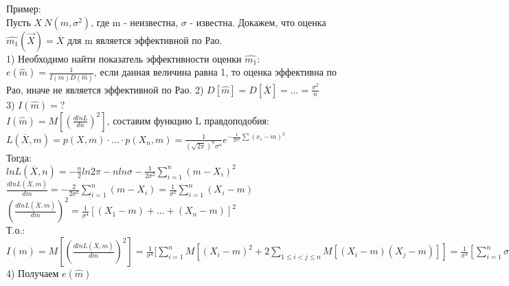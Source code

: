 Пример:\\
Пусть $X ~ N(m, \sigma^{2})$, где m - неизвестна, $\sigma$ - известна. Докажем, что оценка $\hat{m_{1}}(\overrightarrow{X}) = \overline{X}$ для m является эффективной по Рао.\\
1) Необходимо найти показатель эффективности оценки $\hat{m_{1}}$:\\
$e(\hat{m}) = \frac{1}{I(m)D(\hat{m})}$, если данная величина равна 1, то оценка эффективна по Рао, иначе не является эффективной по Рао.
2) $D[\hat{m}] = D[\overline{X}] = ... = \frac{\sigma^{2}}{n}$\\
3) $I(\hat{m}) = ?$\\
$I(\hat{m})=M[(\frac{d ln L}{dn})^{2}]$, составим функцию L правдоподобия:\\
$L(\overline{X}, m) = p(X, m)\cdot ... \cdot p(X_{n}, m) = \frac{1}{(\sqrt{2 \pi})^{n} \sigma^{n}}e^{-\frac{1}{2\sigma^{2}}\sum(x_{i}-m)^{2}}$\\
Тогда:\\
$ln L(\overline{X}, n) = -\frac{n}{2}ln 2\pi - n ln \sigma - \frac{1}{2\sigma^{2}}\sum_{i=1}^{n}(m - X_{i})^{2}$\\
$\frac{dln L(\overline{X}, m)}{dm} = -\frac{2}{2\sigma^{2}}\sum\limits_{i=1}^{n}(m - X_{i}) = \frac{1}{\sigma^{2}}\sum_{i=1}^{n}(X_{i} - m)$\\
$(\frac{dln L(\overline{X}, m)}{dm})^{2} = \frac{1}{\sigma^{4}}[(X_{1} - m) + ... + (X_{n} - m)]^{2}$\\
Т.о.:\\
$I(m) = M[(\frac{d ln L(\overline{X}, m)}{dm})^{2}] = \frac{1}{\sigma^{4}}[\sum\limits_{i=1}^{n}M[(X_{i} - m)^{2} + 2\sum\limits_{1 \leqslant i < j \leqslant n}M[(X_{i} - m)(X_{j} - m)]] = \frac{1}{\sigma^{4}}[\sum\limits_{i=1}^{n} \sigma^{2} + 0] = \frac{1}{\sigma^{4}} n\sigma^{2} = \frac{n}{\sigma^{2}}$\\
4) Получаем $e(\hat{m})$\\